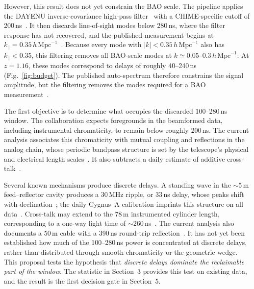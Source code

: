 \documentclass[12pt]{article}
\newcommand{\hMpc}{\,h\,\mathrm{Mpc}^{-1}}
\newcommand{\kpar}{k_\parallel}
\begin{document}
However, this result does not yet constrain the BAO scale. The pipeline applies the DAYENU inverse-covariance high-pass filter~\cite[Sec.~3.2; Eqs.~(21)--(25)]{dayenu} with a CHIME-specific cutoff of 200\,ns~\cite[Sec.~3.2.3; Eqs.~(15)--(18)]{chime2025auto}. It then discards line-of-sight modes below 280\,ns, where the filter response has not recovered, and the published measurement begins at $\kpar=0.35\hMpc$~\cite[Sec.~5.3; Eq.~(64); Fig.~10]{chime2025auto}. Because every mode with $|k|<0.35\hMpc$ also has $\kpar<0.35$, this filtering removes all BAO-scale modes at $k\simeq0.05$--$0.3\hMpc$. At $z=1.16$, these modes correspond to delays of roughly 40--240\,ns (Fig.~\ref{fig:budget}). The published auto-spectrum therefore constrains the signal amplitude, but the filtering removes the modes required for a BAO measurement~\cite[Sec.~3.2]{chime2025auto}.

The first objective is to determine what occupies the discarded 100--280\,ns window. The collaboration expects foregrounds in the beamformed data, including instrumental chromaticity, to remain below roughly 200\,ns. The current analysis associates this chromaticity with mutual coupling and reflections in the analog chain, whose periodic bandpass structure is set by the telescope's physical and electrical length scales~\cite[Sec.~3.2; Sec.~3.2.3, Eqs.~(15)--(18)]{chime2025auto}. It also subtracts a daily estimate of additive cross-talk~\cite[Sec.~3.5.2; Eq.~(27)]{chime2025auto}.

Several known mechanisms produce discrete delays. A standing wave in the $\sim$5\,m feed--reflector cavity produces a 30\,MHz ripple, or 33\,ns delay, whose peaks shift with declination~\cite[Sec.~V; Figs.~4--5]{chime2024holo}; the daily Cygnus~A calibration imprints this structure on all data~\cite[Fig.~5]{chime2025auto}. Cross-talk may extend to the 78\,m instrumented cylinder length, corresponding to a one-way light time of $\sim$260\,ns~\cite[Appendix; Table~2]{chime2022}. The current analysis also documents a 50\,m cable with a 390\,ns round-trip reflection~\cite[Sec.~7.9]{chime2025auto}. It has not yet been established how much of the 100--280\,ns power is concentrated at discrete delays, rather than distributed through smooth chromaticity or the geometric wedge. This proposal tests the hypothesis that \emph{discrete delays dominate the reclaimable part of the window}. The statistic in Section~3 provides this test on existing data, and the result is the first decision gate in Section~5.
\end{document}
